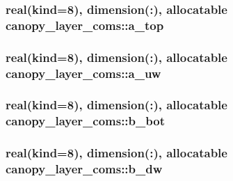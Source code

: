 \subsubsection[{\texorpdfstring{a\+\_\+top}{a_top}}]{\setlength{\rightskip}{0pt plus 5cm}real(kind=8), dimension(\+:), allocatable canopy\+\_\+layer\+\_\+coms\+::a\+\_\+top}\hypertarget{namespacecanopy__layer__coms_acef66a2794edd028cbebb25b81c94582}{}\label{namespacecanopy__layer__coms_acef66a2794edd028cbebb25b81c94582}
\subsubsection[{\texorpdfstring{a\+\_\+uw}{a_uw}}]{\setlength{\rightskip}{0pt plus 5cm}real(kind=8), dimension(\+:), allocatable canopy\+\_\+layer\+\_\+coms\+::a\+\_\+uw}\hypertarget{namespacecanopy__layer__coms_a0aee7af32fcb60ed8f8935d4d74ea9db}{}\label{namespacecanopy__layer__coms_a0aee7af32fcb60ed8f8935d4d74ea9db}
\subsubsection[{\texorpdfstring{b\+\_\+bot}{b_bot}}]{\setlength{\rightskip}{0pt plus 5cm}real(kind=8), dimension(\+:), allocatable canopy\+\_\+layer\+\_\+coms\+::b\+\_\+bot}\hypertarget{namespacecanopy__layer__coms_a6d1bef43490e88277ca78abdc845766c}{}\label{namespacecanopy__layer__coms_a6d1bef43490e88277ca78abdc845766c}
\subsubsection[{\texorpdfstring{b\+\_\+dw}{b_dw}}]{\setlength{\rightskip}{0pt plus 5cm}real(kind=8), dimension(\+:), allocatable canopy\+\_\+layer\+\_\+coms\+::b\+\_\+dw}\hypertarget{namespacecanopy__layer__coms_a4a34e13a815b0c72c3ac6ab0e4cc3c42}{}\label{namespacecanopy__layer__coms_a4a34e13a815b0c72c3ac6ab0e4cc3c42}
